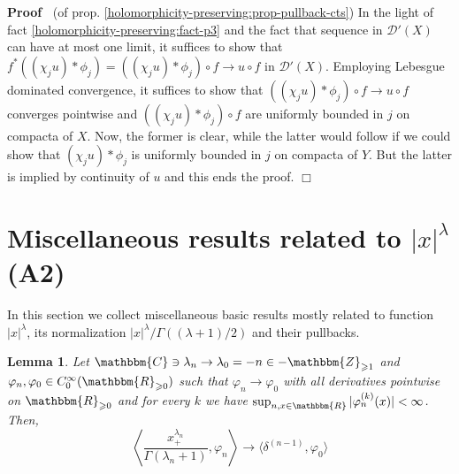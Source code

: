 \documentclass{article}
\renewenvironment{proof}{\noindent\textbf{Proof\ }}{\hspace*{\fill}$\Box$\medskip}
\newtheorem{lemma}[proposition]{Lemma}
\theoremstyle{remark}
\begin{document}
\begin{proof}
  (of prop. \ref{holomorphicity-preserving:prop-pullback-cts}) In the light of
  fact \ref{holomorphicity-preserving:fact-p3} and the fact that sequence in
  $\mathcal{D}' (X)$ can have at most one limit, it suffices to show that
  $f^{\ast} ((\chi_j u) \ast \phi_j) = ((\chi_j u) \ast \phi_j) \circ f
  \rightarrow u \circ f$ in $\mathcal{D}' (X)$. Employing Lebesgue dominated
  convergence, it suffices to show that $((\chi_j u) \ast \phi_j) \circ f
  \rightarrow u \circ f$ converges pointwise and $((\chi_j u) \ast \phi_j)
  \circ f$ are uniformly bounded in $j$ on compacta of $X$. Now, the former is
  clear, while the latter would follow if we could show that $(\chi_j u) \ast
  \phi_j$ is uniformly bounded in $j$ on compacta of $Y$. But the latter is
  implied by continuity of $u$ and this ends the proof.
\end{proof}

\section{Miscellaneous results related to $| x |^{\lambda}$ (A2)}

In this section we collect miscellaneous basic results mostly related to
function $| x |^{\lambda}$, its normalization $| x |^{\lambda} / \Gamma
((\lambda + 1) / 2)$ and their pullbacks.

\begin{lemma}
  \label{supp-n-waves:lem-weakened-conv}Let $\mathbbm{C} \ni \lambda_n
  \rightarrow \lambda_0 = - n \in -\mathbbm{Z}_{\geqslant 1}$ and $\varphi_n,
  \varphi_0 \in C^{\infty}_0 (\mathbbm{R}_{\geqslant 0})$ such that $\varphi_n
  \rightarrow \varphi_0$ with all derivatives pointwise on
  $\mathbbm{R}_{\geqslant 0}$ and for every $k$ we have $\sup_{n, x \in
  \mathbbm{R}} | \varphi_n^{(k)} (x) | < \infty$. Then,
  \[ \left\langle \frac{x_+^{\lambda_n}}{\Gamma (\lambda_n + 1)}, \varphi_n
     \right\rangle \rightarrow \langle \delta^{(n - 1)}, \varphi_0 \rangle \]
\end{lemma}
\end{document}
